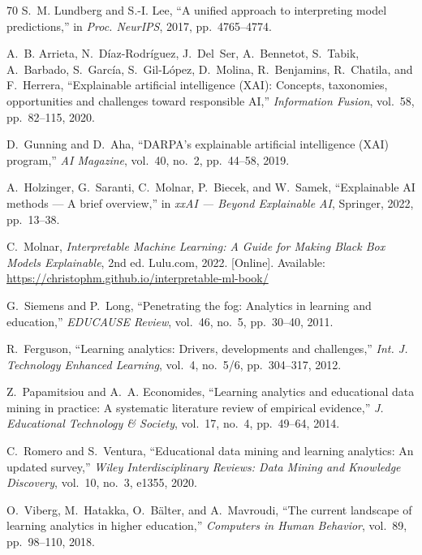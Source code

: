 \begin{thebibliography}{70}
S.~M. Lundberg and S.-I. Lee,
``A unified approach to interpreting model predictions,''
in \textit{Proc. NeurIPS}, 2017, pp.~4765--4774.

A.~B. Arrieta, N.~D{\'i}az-Rodr{\'i}guez, J.~Del~Ser, A.~Bennetot, S.~Tabik, A.~Barbado, S.~Garc{\'i}a, S.~Gil-L{\'o}pez, D.~Molina, R.~Benjamins, R.~Chatila, and F.~Herrera,
``Explainable artificial intelligence (XAI): Concepts, taxonomies, opportunities and challenges toward responsible AI,''
\textit{Information Fusion}, vol.~58, pp.~82--115, 2020.

D.~Gunning and D.~Aha,
``DARPA's explainable artificial intelligence (XAI) program,''
\textit{AI Magazine}, vol.~40, no.~2, pp.~44--58, 2019.

A.~Holzinger, G.~Saranti, C.~Molnar, P.~Biecek, and W.~Samek,
``Explainable AI methods — A brief overview,''
in \textit{xxAI — Beyond Explainable AI}, Springer, 2022, pp.~13--38.

C.~Molnar,
\textit{Interpretable Machine Learning: A Guide for Making Black Box Models Explainable}, 2nd ed.
Lulu.com, 2022.
[Online]. Available: \url{https://christophm.github.io/interpretable-ml-book/}

G.~Siemens and P.~Long,
``Penetrating the fog: Analytics in learning and education,''
\textit{EDUCAUSE Review}, vol.~46, no.~5, pp.~30--40, 2011.

R.~Ferguson,
``Learning analytics: Drivers, developments and challenges,''
\textit{Int. J. Technology Enhanced Learning}, vol.~4, no.~5/6, pp.~304--317, 2012.

Z.~Papamitsiou and A.~A. Economides,
``Learning analytics and educational data mining in practice: A systematic literature review of empirical evidence,''
\textit{J. Educational Technology \& Society}, vol.~17, no.~4, pp.~49--64, 2014.

C.~Romero and S.~Ventura,
``Educational data mining and learning analytics: An updated survey,''
\textit{Wiley Interdisciplinary Reviews: Data Mining and Knowledge Discovery}, vol.~10, no.~3, e1355, 2020.

O.~Viberg, M.~Hatakka, O.~B{\"{a}}lter, and A.~Mavroudi,
``The current landscape of learning analytics in higher education,''
\textit{Computers in Human Behavior}, vol.~89, pp.~98--110, 2018.


\end{thebibliography}
